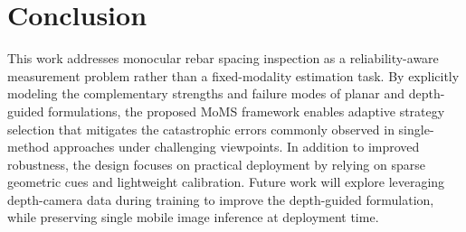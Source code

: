 \documentclass{article}
\begin{document}
\section{Conclusion}


This work addresses monocular rebar spacing inspection as a reliability-aware measurement problem rather than a fixed-modality estimation task. By explicitly modeling the complementary strengths and failure modes of planar and depth-guided formulations, the proposed MoMS framework enables adaptive strategy selection that mitigates the catastrophic errors commonly observed in single-method approaches under challenging viewpoints. In addition to improved robustness, the design focuses on practical deployment by relying on sparse geometric cues and lightweight calibration. Future work will explore leveraging depth-camera data during training to improve the depth-guided formulation, while preserving single mobile image inference at deployment time.


%

\end{document}
